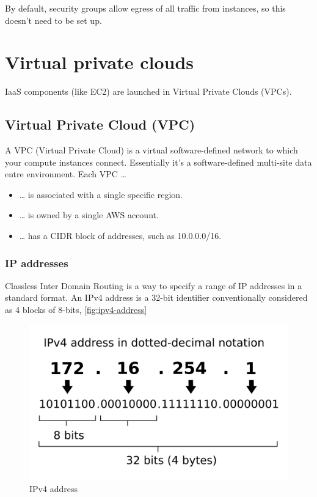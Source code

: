 By default, security groups allow egress of all traffic from instances, so this doesn't need to be set up.

\section{Virtual private clouds}
\label{sec:virtual-private-clouds}

IaaS components (like EC2) are launched in Virtual Private Clouds (VPCs).

\subsection{Virtual Private Cloud (VPC)}

A VPC (Virtual Private Cloud)  is a virtual software-defined network to which your compute instances connect.
Essentially it's a software-defined multi-site data entre environment.
Each VPC \ldots{}

\begin{itemize}
\item
  \ldots{} is associated with a single specific region.
\item
  \ldots{} is owned by a single AWS account.
\item
  \ldots{} has a CIDR block of addresses, such as 10.0.0.0/16.
\end{itemize}

\subsubsection{IP addresses}

Classless Inter Domain Routing is a way to specify a range of IP addresses in a standard format.
An IPv4 address is a 32-bit identifier conventionally considered as 4 blocks of 8-bits, \autoref{fig:ipv4-address}

\begin{figure}[htbp]
  \centering
  \includegraphics[width=0.5\linewidth]{ipv4_address}
  \caption{IPv4 address}
  \label{fig:ipv4-address}
\end{figure}

